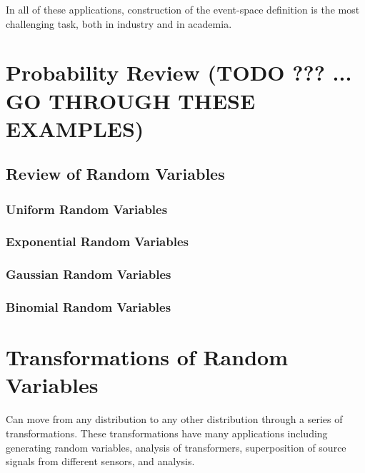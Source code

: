 \documentclass{report}
\begin{document}
In all of these applications, construction of the event-space definition is the most challenging task, both in industry and in academia. 









\section{Probability Review (TODO ??? ... GO THROUGH THESE EXAMPLES)}

\subsection{Review of Random Variables}

\subsubsection{Uniform Random Variables}

\subsubsection{Exponential Random Variables}

\subsubsection{Gaussian Random Variables}

\subsubsection{Binomial Random Variables}

\section{Transformations of Random Variables}

Can move from any distribution to any other distribution through a series of transformations. These transformations have many applications including generating random variables, analysis of transformers, superposition of source signals from different sensors, and analysis.
\end{document}
